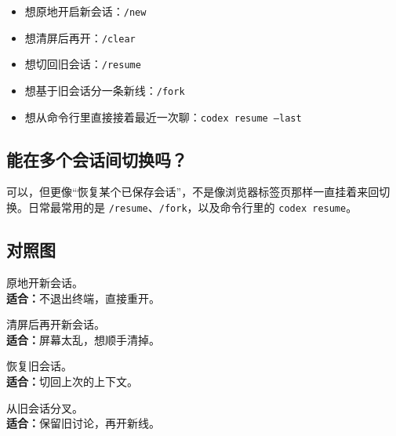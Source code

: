 \documentclass[UTF8,a4paper,11pt]{ctexart}
\begin{document}
\begin{itemize}
  \item 想原地开启新会话：\texttt{/new}
  \item 想清屏后再开：\texttt{/clear}
  \item 想切回旧会话：\texttt{/resume}
  \item 想基于旧会话分一条新线：\texttt{/fork}
  \item 想从命令行里直接接着最近一次聊：\texttt{codex resume --last}
\end{itemize}

\subsection{能在多个会话间切换吗？}

可以，但更像“恢复某个已保存会话”，不是像浏览器标签页那样一直挂着来回切换。日常最常用的是 \texttt{/resume}、\texttt{/fork}，以及命令行里的 \texttt{codex resume}。

\subsection{对照图}

\begin{center}
\begin{tcbraster}[raster columns=2, raster equal height=rows, raster column skip=6pt, raster row skip=6pt]
\begin{tcolorbox}[colback=AccentLight, colframe=Accent, title=\texttt{/new}]
原地开新会话。\\
\textbf{适合：}不退出终端，直接重开。
\end{tcolorbox}
\begin{tcolorbox}[colback=SummaryLight, colframe=Summary, title=\texttt{/clear}]
清屏后再开新会话。\\
\textbf{适合：}屏幕太乱，想顺手清掉。
\end{tcolorbox}
\begin{tcolorbox}[colback=AccentLight, colframe=Accent, title=\texttt{/resume}]
恢复旧会话。\\
\textbf{适合：}切回上次的上下文。
\end{tcolorbox}
\begin{tcolorbox}[colback=SummaryLight, colframe=Summary, title=\texttt{/fork}]
从旧会话分叉。\\
\textbf{适合：}保留旧讨论，再开新线。
\end{tcolorbox}
\end{tcbraster}
\end{center}
\end{document}

